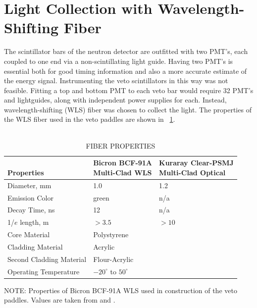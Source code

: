 \section{Light Collection with Wavelength-Shifting Fiber}

The scintillator bars of the neutron detector are outfitted with two PMT's, each coupled to one end via a non-scintillating light guide.  Having two PMT's is essential both for good timing information and also a more accurate estimate of the energy signal.  Instrumenting the veto scintillators in this way was not feasible.  Fitting a top and bottom PMT to each veto bar would require 32 PMT's and lightguides, along with independent power supplies for each.  Instead, wavelength-shifting (WLS) fiber was chosen to collect the light.  The properties of the WLS fiber used in the veto paddles are shown in {\tab}~\ref{tab:WLS_Kuraray}.
\begin{table}[htp]
\centering
\caption[\uppercase{fiber properties}]{\\\uppercase{fiber properties}}
\label{tab:WLS_Kuraray}
\begin{tabular}{lll}\toprule
\pbox{20cm}{\hspace{1cm}\\Properties} & \pbox{20cm}{Bicron BCF-91A \\Multi-Clad WLS} & \pbox{20cm}{Kuraray Clear-PSMJ \\Multi-Clad Optical}\\
\midrule
Diameter, mm & 1.0 & 1.2\\
Emission Color & green & n/a\\
Decay Time, ns & 12 & n/a\\
1/$e$ length, m & $>3.5$ & $>10$\\
Core Material & Polystyrene & \\
Cladding Material & Acrylic & \\
Second Cladding Material & Flour-Acrylic \\
Operating Temperature & $-20^{\circ}$ to $50^{\circ}$ & \\
\bottomrule
\end{tabular}
\begin{flushleft}
\small NOTE:
Properties of Bicron BCF-91A WLS used in construction of the veto paddles.  Values are taken from \citep{BCF-91A} and \citep{kuraray}.
\end{flushleft}
\end{table}

